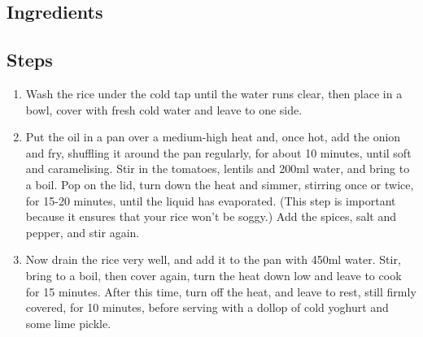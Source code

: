 \documentclass{book}
\begin{document}
\subsection*{Ingredients}
\subsection*{Steps}
\begin{enumerate}
\item Wash the rice under the cold tap until the water runs clear, then place in a bowl, cover with fresh cold water and leave to one side.
\item Put the oil in a pan over a medium-high heat and, once hot, add the onion and fry, shuffling it around the pan regularly, for about 10 minutes, until soft and caramelising. Stir in the tomatoes, lentils and 200ml water, and bring to a boil. Pop on the lid, turn down the heat and simmer, stirring once or twice, for 15-20 minutes, until the liquid has evaporated. (This step is important because it ensures that your rice won’t be soggy.) Add the spices, salt and pepper, and stir again.
\item Now drain the rice very well, and add it to the pan with 450ml water. Stir, bring to a boil, then cover again, turn the heat down low and leave to cook for 15 minutes. After this time, turn off the heat, and leave to rest, still firmly covered, for 10 minutes, before serving with a dollop of cold yoghurt and some lime pickle.
\end{enumerate}
\newpage
\end{document}
